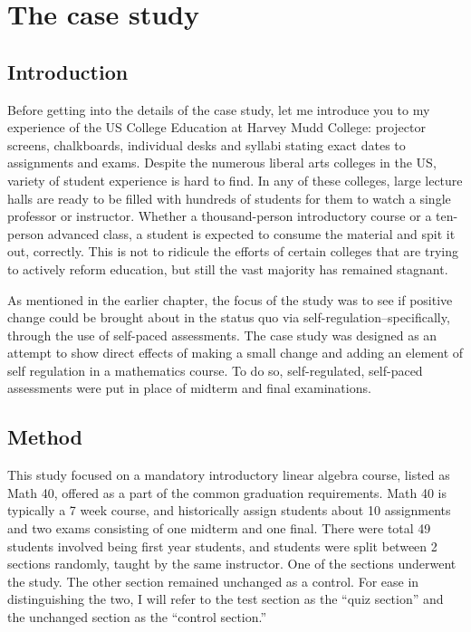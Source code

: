 \chapter{The case study}
\section{Introduction}

Before getting into the details of the case study, let me introduce you to my experience of the US College Education at Harvey Mudd College: projector screens, chalkboards, individual desks and syllabi stating exact dates to assignments and exams. Despite the numerous liberal arts colleges in the US, variety of student experience is hard to find. In any of these colleges, large lecture halls are ready to be filled with hundreds of students for them to watch a single professor or instructor. Whether a thousand-person introductory course or a ten-person advanced class, a student is expected to consume the material and spit it out, correctly. This is not to ridicule the efforts of certain colleges that are trying to actively reform education, but still the vast majority has remained stagnant.

As mentioned in the earlier chapter, the focus of the study was to see if positive change could be brought about in the status quo via self-regulation--specifically, through the use of self-paced assessments. The case study was designed as an attempt to show direct effects of making a small change and adding an element of self regulation in a mathematics course. To do so, self-regulated, self-paced assessments were put in place of midterm and final examinations.

\section{Method}
This study focused on a mandatory introductory linear algebra course, listed as Math 40, offered as a part of the common graduation requirements. Math 40 is typically a 7 week course, and historically assign students about 10 assignments and two exams consisting of one midterm and one final. There were total 49 students involved being first year students, and students were split between 2 sections randomly, taught by the same instructor. One of the sections underwent the study. The other section remained unchanged as a control. For ease in distinguishing the two, I will refer to the test section as the ``quiz section'' and the unchanged section as the ``control section.''

